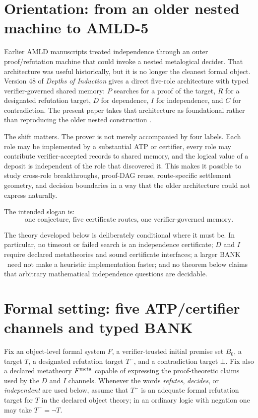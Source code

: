 \documentclass[11pt]{article}
\theoremstyle{remark}
\newcommand{\BANK}{\ensuremath{\mathrm{BANK}}}
\begin{document}
\tableofcontents
\newpage

\section{Orientation: from an older nested machine to AMLD-5}

Earlier AMLD manuscripts treated independence through an outer proof/refutation machine that could invoke a nested metalogical decider. That architecture was useful historically, but it is no longer the cleanest formal object. Version 48 of \emph{Depths of Induction} gives a direct five-role architecture with typed verifier-governed shared memory: $P$ searches for a proof of the target, $R$ for a designated refutation target, $D$ for dependence, $I$ for independence, and $C$ for contradiction. The present paper takes that architecture as foundational rather than reproducing the older nested construction \cite{depths48}.

The shift matters. The prover is not merely accompanied by four labels. Each role may be implemented by a substantial ATP or certifier, every role may contribute verifier-accepted records to shared memory, and the logical value of a deposit is independent of the role that discovered it. This makes it possible to study cross-role breakthroughs, proof-DAG reuse, route-specific settlement geometry, and decision boundaries in a way that the older architecture could not express naturally.

The intended slogan is:
\[
\boxed{\text{one conjecture, five certificate routes, one verifier-governed memory}.}
\]

The theory developed below is deliberately conditional where it must be. In particular, no timeout or failed search is an independence certificate; $D$ and $I$ require declared metatheories and sound certificate interfaces; a larger \BANK\ need not make a heuristic implementation faster; and no theorem below claims that arbitrary mathematical independence questions are decidable.

\section{Formal setting: five ATP/certifier channels and typed BANK}

Fix an object-level formal system $F$, a verifier-trusted initial premise set $B_0$, a target $T$, a designated refutation target $T^-$, and a contradiction target $\bot$. Fix also a declared metatheory $F^{\rm meta}$ capable of expressing the proof-theoretic claims used by the $D$ and $I$ channels. Whenever the words \emph{refutes}, \emph{decides}, or \emph{independent} are used below, assume that $T^-$ is an adequate formal refutation target for $T$ in the declared object theory; in an ordinary logic with negation one may take $T^-=\neg T$.
\end{document}

